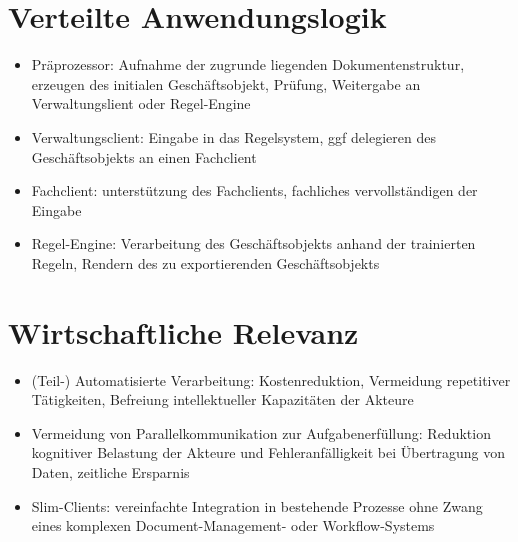 \documentclass[11pt,oneside,a4paper,notitlepage]{article}
\begin{document}
\section{Verteilte Anwendungslogik}
\begin{itemize}
\item Präprozessor: Aufnahme der zugrunde liegenden Dokumentenstruktur, erzeugen des initialen Geschäftsobjekt, Prüfung, Weitergabe an Verwaltungslient oder Regel-Engine
\item Verwaltungsclient: Eingabe in das Regelsystem, ggf delegieren des Geschäftsobjekts an einen Fachclient
\item Fachclient: unterstützung des Fachclients, fachliches vervollständigen der Eingabe
\item Regel-Engine: Verarbeitung des Geschäftsobjekts anhand der trainierten Regeln, Rendern des zu exportierenden Geschäftsobjekts
\end{itemize}
%
\section{Wirtschaftliche Relevanz}
\begin{itemize}
\item (Teil-) Automatisierte Verarbeitung: Kostenreduktion, Vermeidung repetitiver Tätigkeiten, Befreiung intellektueller Kapazitäten der Akteure
\item Vermeidung von Parallelkommunikation zur Aufgabenerfüllung: Reduktion kognitiver Belastung der Akteure und Fehleranfälligkeit bei Übertragung von Daten, zeitliche Ersparnis
\item Slim-Clients: vereinfachte Integration in bestehende Prozesse ohne Zwang eines komplexen Document-Management- oder Workflow-Systems
\end{itemize}
\end{document}
